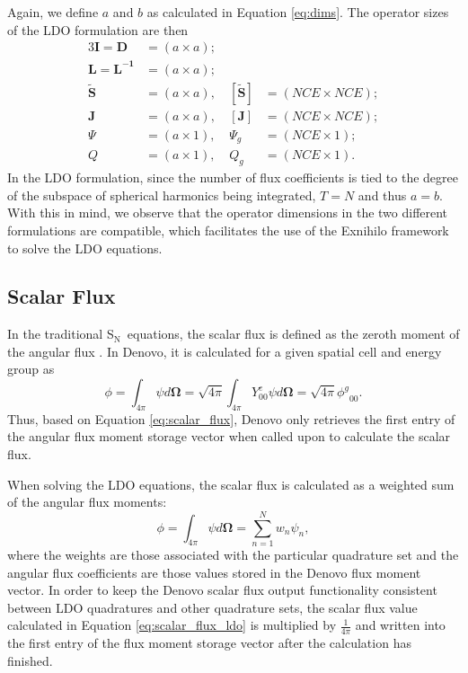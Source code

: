 \documentclass{article} %
\newcommand{\bo}{\mathbf\Omega}
\newcommand{\sn}{S$_\mathrm{N}$}
\newcommand{\ve}[1]{\ensuremath{\mathbf{#1}}}
\newcommand{\even}{\ensuremath{\phi^g}}
\begin{document}
%
Again, we define $a$ and $b$ as calculated in Equation \eqref{eq:dims}.
The operator sizes of the LDO formulation are then
%
\begin{alignat*}{3}
\ve{I} = \ve{D} &=      (a \times a); \\
\ve{L} = \ve{L^{-1}} &= (a \times a); \\
\ve{\tilde{S}} &=      (a \times a),\ &[\ve{\tilde{S}}] &= (NCE \times NCE); \\
\ve{J} &=              (a \times a),\ &[\ve{J}] &= (NCE \times NCE); \\
\Psi &=                (a \times 1),\ &\Psi_g   &= (NCE \times 1); \\
Q &=                   (a \times 1),\ &Q_g      &= (NCE \times 1).
\end{alignat*}
%
In the LDO formulation, since the number of flux coefficients is tied
to the degree of the subspace of spherical harmonics being integrated, $T = N$
and thus $a = b$. With this in mind, we observe that the operator dimensions in
the two different formulations are compatible, which facilitates the use of the
Exnihilo framework to solve the LDO equations.

\subsection{Scalar Flux}
\label{sec:flux}

In the traditional \sn\ equations, the scalar flux is
defined as the zeroth moment of the angular flux \cite{exmm}. In Denovo, it is
calculated for a given spatial cell and energy group as
%
\begin{equation}
\phi = \int_{4\pi}\psi d\bo = \sqrt{4\pi}\int_{4\pi}Y_{00}^{e}\psi d\bo
     = \sqrt{4\pi}\even_{00}.
\label{eq:scalar_flux}
\end{equation}
%
Thus, based on Equation \eqref{eq:scalar_flux}, Denovo only retrieves
the first entry of the angular flux moment storage vector when called upon to
calculate the scalar flux.

When solving the LDO equations, the scalar flux is calculated as a 
weighted sum of the angular flux moments:
%
\begin{equation}
\phi = \int_{4\pi}\psi d\bo = \sum_{n=1}^{N}w_n\psi_n,
\label{eq:scalar_flux_ldo}
\end{equation}
%
where the weights are those associated with the particular quadrature
set and the angular flux coefficients are those values stored in the Denovo
flux moment vector. In order to keep the Denovo scalar flux output 
functionality consistent between LDO quadratures and other quadrature sets, the
scalar flux value calculated in Equation \eqref{eq:scalar_flux_ldo} is multiplied
by $\tfrac{1}{4\pi}$ and written into the first entry of the flux moment
storage vector after the calculation has finished.
\end{document}
